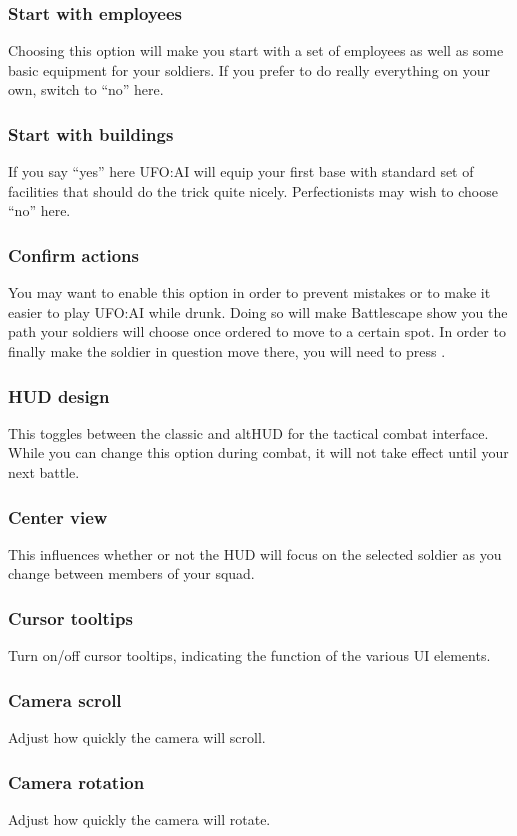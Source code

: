 \subsubsection*{Start with employees}
Choosing this option will make you start with a set of employees as well as some basic equipment for your soldiers. If you prefer to do really everything on your own, switch to ``no'' here.

\subsubsection*{Start with buildings}
If you say ``yes'' here UFO:AI will equip your first base with standard set of facilities that should do the trick quite nicely. Perfectionists may wish to choose ``no'' here.

\subsubsection*{Confirm actions}
You may want to enable this option in order to prevent mistakes or to make it easier to play UFO:AI while drunk. Doing so will make Battlescape show you the path your soldiers will choose once ordered to move to a certain spot. In order to finally make the soldier in question move there, you will need to press .

\subsubsection*{HUD design}
This toggles between the classic and altHUD for the tactical combat interface. While you can change this option during combat, it will not take effect until your next battle.

\subsubsection*{Center view}
This influences whether or not the HUD will focus on the selected soldier as you change between members of your squad.

\subsubsection*{Cursor tooltips}
Turn on/off cursor tooltips, indicating the function of the various UI elements.

\subsubsection*{Camera scroll}
Adjust how quickly the camera will scroll.

\subsubsection*{Camera rotation}
Adjust how quickly the camera will rotate.
